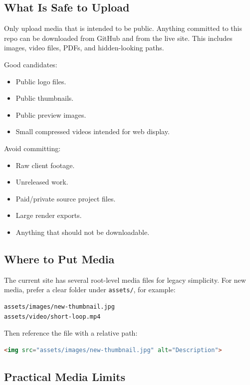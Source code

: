 \documentclass[11pt]{article}
\begin{document}
\subsection{What Is Safe to Upload}

Only upload media that is intended to be public. Anything committed to this repo can be downloaded from GitHub and from the live site. This includes images, video files, PDFs, and hidden-looking paths.

Good candidates:

\begin{itemize}
  \item Public logo files.
  \item Public thumbnails.
  \item Public preview images.
  \item Small compressed videos intended for web display.
\end{itemize}

Avoid committing:

\begin{itemize}
  \item Raw client footage.
  \item Unreleased work.
  \item Paid/private source project files.
  \item Large render exports.
  \item Anything that should not be downloadable.
\end{itemize}

\subsection{Where to Put Media}

The current site has several root-level media files for legacy simplicity. For new media, prefer a clear folder under \texttt{assets/}, for example:

\begin{lstlisting}
assets/images/new-thumbnail.jpg
assets/video/short-loop.mp4
\end{lstlisting}

Then reference the file with a relative path:

\begin{lstlisting}[language=HTML]
<img src="assets/images/new-thumbnail.jpg" alt="Description">
\end{lstlisting}

\subsection{Practical Media Limits}
\end{document}
